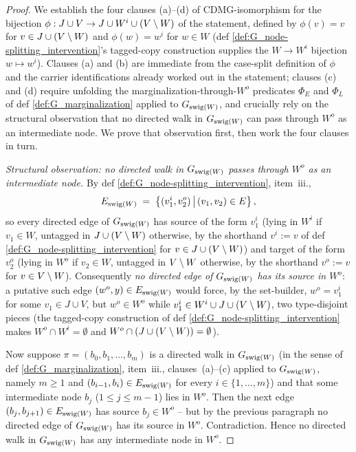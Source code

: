 \documentclass[main]{subfiles}
\begin{document}
\begin{proof}
We establish the four clauses (a)--(d) of CDMG-isomorphism for the bijection $\phi : J \cup V \to J \cup W^i \cup (V \setminus W)$ of the statement, defined by $\phi(v) = v$ for $v \in J \cup (V \setminus W)$ and $\phi(w) = w^i$ for $w \in W$ (def \ref{def:G_node-splitting_intervention}'s tagged-copy construction supplies the $W \to W^i$ bijection $w \mapsto w^i$). Clauses (a) and (b) are immediate from the case-split definition of $\phi$ and the carrier identifications already worked out in the statement; clauses (c) and (d) require unfolding the marginalization-through-$W^o$ predicates $\Phi_E$ and $\Phi_L$ of def \ref{def:G_marginalization} applied to $G_{\mathrm{swig}(W)}$, and crucially rely on the structural observation that no directed walk in $G_{\mathrm{swig}(W)}$ can pass through $W^o$ as an intermediate node. We prove that observation first, then work the four clauses in turn.

\medskip\noindent\emph{Structural observation: no directed walk in $G_{\mathrm{swig}(W)}$ passes through $W^o$ as an intermediate node.}
By def \ref{def:G_node-splitting_intervention}, item~iii.,
\[
    E_{\mathrm{swig}(W)} \;=\; \left \{ (v_1^i, v_2^o) \,\middle|\, (v_1, v_2) \in E \right \},
\]
so every directed edge of $G_{\mathrm{swig}(W)}$ has source of the form $v_1^i$ (lying in $W^i$ if $v_1 \in W$, untagged in $J \cup (V \setminus W)$ otherwise, by the shorthand $v^i := v$ of def \ref{def:G_node-splitting_intervention} for $v \in J \cup (V \setminus W)$) and target of the form $v_2^o$ (lying in $W^o$ if $v_2 \in W$, untagged in $V \setminus W$ otherwise, by the shorthand $v^o := v$ for $v \in V \setminus W$). Consequently \emph{no directed edge of $G_{\mathrm{swig}(W)}$ has its source in $W^o$}: a putative such edge $(w^o, y) \in E_{\mathrm{swig}(W)}$ would force, by the set-builder, $w^o = v_1^i$ for some $v_1 \in J \cup V$, but $w^o \in W^o$ while $v_1^i \in W^i \cup J \cup (V \setminus W)$, two type-disjoint pieces (the tagged-copy construction of def \ref{def:G_node-splitting_intervention} makes $W^o \cap W^i = \emptyset$ and $W^o \cap (J \cup (V \setminus W)) = \emptyset$).

Now suppose $\pi = (b_0, b_1, \ldots, b_m)$ is a directed walk in $G_{\mathrm{swig}(W)}$ (in the sense of def \ref{def:G_marginalization}, item~iii., clauses~(a)--(c) applied to $G_{\mathrm{swig}(W)}$, namely $m \ge 1$ and $(b_{i-1}, b_i) \in E_{\mathrm{swig}(W)}$ for every $i \in \{1, \ldots, m\}$) and that some intermediate node $b_j$ ($1 \le j \le m-1$) lies in $W^o$. Then the next edge $(b_j, b_{j+1}) \in E_{\mathrm{swig}(W)}$ has source $b_j \in W^o$ -- but by the previous paragraph no directed edge of $G_{\mathrm{swig}(W)}$ has its source in $W^o$. Contradiction. Hence no directed walk in $G_{\mathrm{swig}(W)}$ has any intermediate node in $W^o$.


\end{proof}
\end{document}
